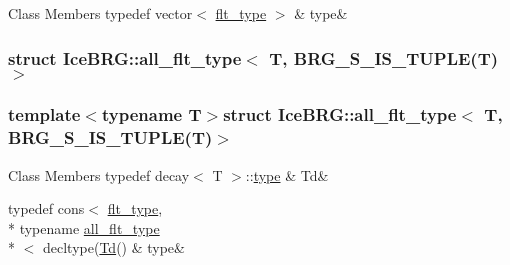 \begin{DoxyFields}{Class Members}
\hypertarget{namespaceIceBRG_ad1ddb7ba3126d7b47432b16a10c806ae}{}typedef vector$<$ \hyperlink{lib_2IceBRG__main_2common_8h_ad0f130a56eeb944d9ef2692ee881ecc4}{flt\+\_\+type} $>$\label{namespaceIceBRG_ad1ddb7ba3126d7b47432b16a10c806ae}
&
type&
\\
\hline

\end{DoxyFields}
\label{structIceBRG_1_1all__flt__type_3_01T_00_01BRG__S__IS__TUPLE_07T_08_4}
\hypertarget{namespaceIceBRG_structIceBRG_1_1all__flt__type_3_01T_00_01BRG__S__IS__TUPLE_07T_08_4}{}
\subsubsection{struct Ice\+B\+R\+G\+:\+:all\+\_\+flt\+\_\+type$<$ T, B\+R\+G\+\_\+\+S\+\_\+\+I\+S\+\_\+\+T\+U\+P\+L\+E(T)$>$}
\subsubsection*{template$<$typename T$>$struct Ice\+B\+R\+G\+::all\+\_\+flt\+\_\+type$<$ T, B\+R\+G\+\_\+\+S\+\_\+\+I\+S\+\_\+\+T\+U\+P\+L\+E(\+T)$>$}

\begin{DoxyFields}{Class Members}
\hypertarget{namespaceIceBRG_ae39ecf8d6a11cd360d258fceb83fbdd8}{}typedef decay$<$ T $>$\+::\hyperlink{namespaceIceBRG_a198b89d759e01ef26223c0ffae1cdab8}{type}\label{namespaceIceBRG_ae39ecf8d6a11cd360d258fceb83fbdd8}
&
Td&
\\
\hline

\hypertarget{namespaceIceBRG_a198b89d759e01ef26223c0ffae1cdab8}{}typedef cons$<$ \hyperlink{lib_2IceBRG__main_2common_8h_ad0f130a56eeb944d9ef2692ee881ecc4}{flt\+\_\+type}, \\*
typename \hyperlink{namespaceIceBRG_structIceBRG_1_1all__flt__type}{all\+\_\+flt\+\_\+type}\\*
$<$ decltype(\hyperlink{namespaceIceBRG_ae39ecf8d6a11cd360d258fceb83fbdd8}{Td}()\label{namespaceIceBRG_a198b89d759e01ef26223c0ffae1cdab8}
&
type&
\\
\hline

\end{DoxyFields}
\label{structIceBRG_1_1ct}
\hypertarget{namespaceIceBRG_structIceBRG_1_1ct}{}

